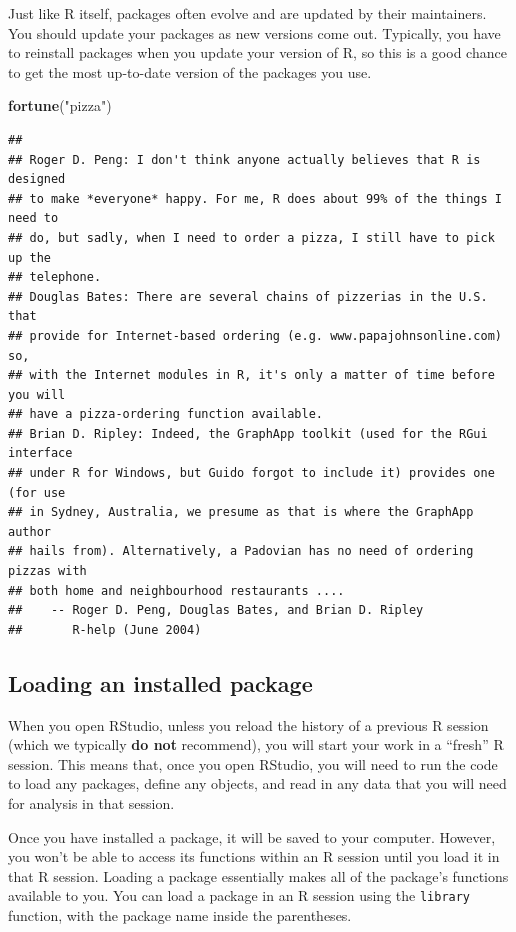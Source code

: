 \documentclass[]{book}
\makeatletter
\newenvironment{Shaded}{\begin{snugshade}}{\end{snugshade}}
\newcommand{\KeywordTok}[1]{\textcolor[rgb]{0.13,0.29,0.53}{\textbf{#1}}}
\newcommand{\StringTok}[1]{\textcolor[rgb]{0.31,0.60,0.02}{#1}}
\newcommand{\NormalTok}[1]{#1}
\newenvironment{kframe}{%
\medskip{}
\setlength{\fboxsep}{.8em}
 \def\at@end@of@kframe{}%
 \ifinner\ifhmode%
  \def\at@end@of@kframe{\end{minipage}}%
  \begin{minipage}{\columnwidth}%
 \fi\fi%
 \def\FrameCommand##1{\hskip\@totalleftmargin \hskip-\fboxsep
 \colorbox{shadecolor}{##1}\hskip-\fboxsep
     \hskip-\linewidth \hskip-\@totalleftmargin \hskip\columnwidth}%
 \MakeFramed {\advance\hsize-\width
   \@totalleftmargin\z@ \linewidth\hsize
   \@setminipage}}%
 {\par\unskip\endMakeFramed%
 \at@end@of@kframe}
\renewenvironment{Shaded}{\begin{kframe}}{\end{kframe}}
\theoremstyle{definition}
\theoremstyle{definition}
\theoremstyle{definition}
\theoremstyle{remark}
\makeatother
\begin{document}
Just like R itself, packages often evolve and are updated by their
maintainers. You should update your packages as new versions come out.
Typically, you have to reinstall packages when you update your version
of R, so this is a good chance to get the most up-to-date version of the
packages you use.

\begin{Shaded}
\begin{Highlighting}[]
\KeywordTok{fortune}\NormalTok{(}\StringTok{"pizza"}\NormalTok{)}
\end{Highlighting}
\end{Shaded}

\begin{verbatim}
## 
## Roger D. Peng: I don't think anyone actually believes that R is designed
## to make *everyone* happy. For me, R does about 99% of the things I need to
## do, but sadly, when I need to order a pizza, I still have to pick up the
## telephone.
## Douglas Bates: There are several chains of pizzerias in the U.S. that
## provide for Internet-based ordering (e.g. www.papajohnsonline.com) so,
## with the Internet modules in R, it's only a matter of time before you will
## have a pizza-ordering function available.
## Brian D. Ripley: Indeed, the GraphApp toolkit (used for the RGui interface
## under R for Windows, but Guido forgot to include it) provides one (for use
## in Sydney, Australia, we presume as that is where the GraphApp author
## hails from). Alternatively, a Padovian has no need of ordering pizzas with
## both home and neighbourhood restaurants ....
##    -- Roger D. Peng, Douglas Bates, and Brian D. Ripley
##       R-help (June 2004)
\end{verbatim}

\subsection{Loading an installed
package}\label{loading-an-installed-package}

When you open RStudio, unless you reload the history of a previous R
session (which we typically \textbf{do not} recommend), you will start
your work in a ``fresh'' R session. This means that, once you open
RStudio, you will need to run the code to load any packages, define any
objects, and read in any data that you will need for analysis in that
session.

Once you have installed a package, it will be saved to your computer.
However, you won't be able to access its functions within an R session
until you load it in that R session. Loading a package essentially makes
all of the package's functions available to you. You can load a package
in an R session using the \texttt{library} function, with the package
name inside the parentheses.
\end{document}
